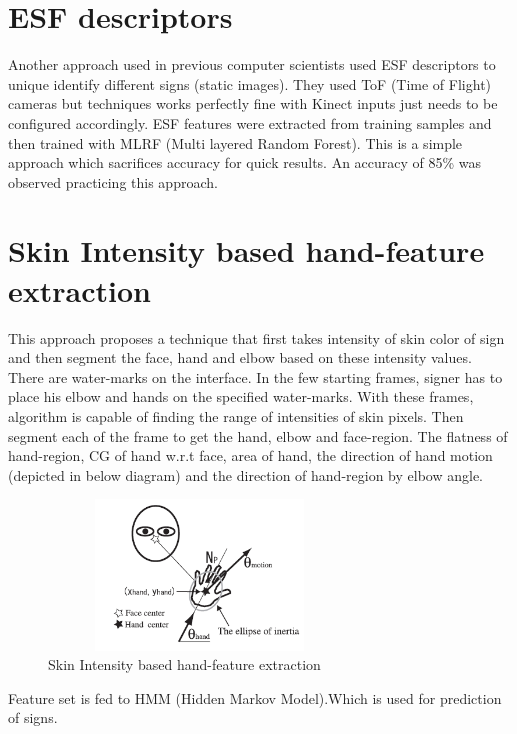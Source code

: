 \section{ESF descriptors}
 Another approach used in previous computer scientists used ESF descriptors to unique identify different signs (static images). They used ToF (Time of Flight) cameras but techniques works perfectly fine with Kinect inputs just needs to be configured accordingly. ESF features were extracted from training samples and then trained with MLRF (Multi layered Random Forest). This is a simple approach which sacrifices accuracy for quick results. An accuracy of 85\% was observed practicing this approach.\cite{no3}

\section{Skin Intensity based hand-feature extraction}
 This approach proposes a technique that first takes intensity of skin color of sign and then segment the face, hand and elbow based on these intensity values. There are water-marks on the interface. In the few starting frames, signer has to place his elbow and hands on the specified water-marks. With these frames, algorithm is capable of finding the range of intensities of skin pixels. Then segment each of the frame to get the hand, elbow and face-region. The flatness of hand-region, CG of hand w.r.t face, area of hand, the direction of hand motion (depicted in below diagram) and the direction of hand-region by elbow angle.\cite{no4}


\begin{figure}[!htb]
	\begin{center}
		\includegraphics[height=4cm, width=8cm]{ThesisFigs/image0}
		\caption{Skin Intensity based hand-feature extraction}\label{fig:image0}
	\end{center}
	
\end{figure}

Feature set is fed to HMM (Hidden Markov Model).Which is used for prediction of signs.

